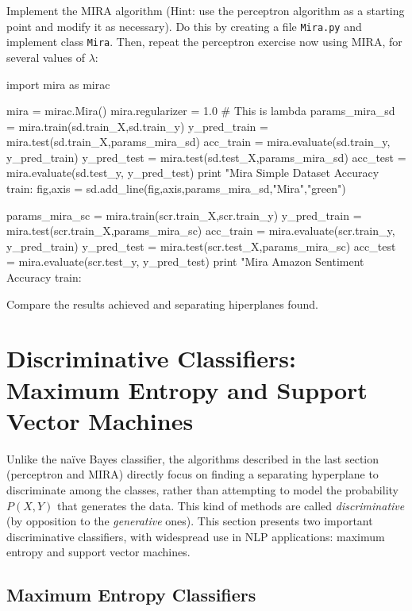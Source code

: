 \begin{exercise}
Implement the MIRA algorithm (Hint: use the perceptron algorithm
  as a starting point and modify it as necessary). Do this by creating a 
  file {\tt Mira.py} and implement class {\tt Mira}. 
  Then, 
  repeat the perceptron exercise now using MIRA, for several values of $\lambda$: 
\begin{python}
import mira as mirac

mira = mirac.Mira()
mira.regularizer = 1.0 # This is lambda
params_mira_sd = mira.train(sd.train_X,sd.train_y)
y_pred_train = mira.test(sd.train_X,params_mira_sd)
acc_train = mira.evaluate(sd.train_y, y_pred_train)
y_pred_test = mira.test(sd.test_X,params_mira_sd)
acc_test = mira.evaluate(sd.test_y, y_pred_test)
print "Mira Simple Dataset Accuracy train: %
fig,axis = sd.add_line(fig,axis,params_mira_sd,"Mira","green")

params_mira_sc = mira.train(scr.train_X,scr.train_y)
y_pred_train = mira.test(scr.train_X,params_mira_sc)
acc_train = mira.evaluate(scr.train_y, y_pred_train)
y_pred_test = mira.test(scr.test_X,params_mira_sc)
acc_test = mira.evaluate(scr.test_y, y_pred_test)
print "Mira Amazon Sentiment Accuracy train: %
\end{python}
  
Compare the
results achieved and separating hiperplanes found.
\end{exercise}



\section{Discriminative Classifiers: Maximum Entropy and Support Vector Machines}

Unlike the na\"ive Bayes classifier, the algorithms described in the last section (perceptron and MIRA) directly focus on 
finding a separating hyperplane to discriminate among the classes, rather than attempting 
to model the probability $P(X,Y)$ that generates the data. 
This kind of methods are called \emph{discriminative} (by opposition to the \emph{generative} ones).  
This section presents two important discriminative classifiers, with widespread use 
in NLP applications: maximum entropy and support vector machines. 
  

\subsection{\label{s:me}Maximum Entropy Classifiers}

